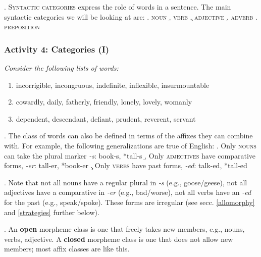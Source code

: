 \documentclass[11pt, oneside]{article}   	%
\begin{document}
\newpage

\ex. {\scshape Syntactic categories} express the role of words in a sentence. The main syntactic categories we will be looking at are:
\a. {\scshape noun}
\b. {\scshape verb}
\c. {\scshape adjective}
\d. {\scshape adverb}
\e. {\scshape preposition}

\subsubsection{Activity 4: Categories (I)}

{\itshape Consider the following lists of words:}

\begin{enumerate}
\item incorrigible, incongruous, indefinite, inflexible, insurmountable
\item cowardly, daily, fatherly, friendly, lonely, lovely, womanly
\item dependent, descendant, defiant, prudent, reverent, servant
\end{enumerate}


\ex. The class of words can also be defined in terms of the affixes they can combine with. For example, the following generalizations are true of English:
\a. Only {\scshape nouns} can take the plural marker {\itshape -s}: book-s, *tall-s
\b. Only {\scshape adjectives} have comparative forms, {\itshape -er}: tall-er, *book-er
\c. Only {\scshape verbs} have past forms, {\itshape -ed}: talk-ed, *tall-ed

\ex. Note that not all nouns have a regular plural in {\itshape -s} (e.g., goose/geese), not all adjectives have a comparative in {\itshape -er} (e.g., bad/worse), not all verbs have an {\itshape -ed} for the past (e.g., speak/spoke).  These forms are irregular (see secc. \ref{allomorphy} and \ref{strategies} further below).

\ex. An {\bfseries open} morpheme class is one that freely takes new members, e.g., nouns, verbs, adjective.  A {\bfseries closed} morpheme class is one that does not allow new members; most affix classes are like this.

\newpage
\end{document}
